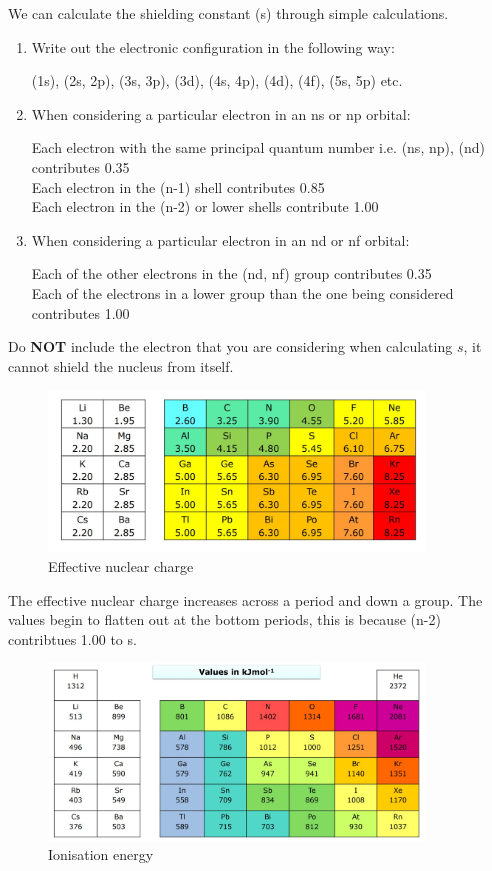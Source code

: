 \documentclass{article}
\newcommand{\NB}{{\large\lefthand}\quad}
\begin{document}
    We can calculate the shielding constant (s) through simple calculations. 
    \begin{enumerate}
        \item Write out the electronic configuration in the following way:
        
        (1s), (2s, 2p), (3s, 3p), (3d), (4s, 4p), (4d), (4f), (5s, 5p) etc.

        \item When considering a particular electron in an ns or np orbital:
        
        Each electron with the same principal quantum number i.e. (ns, np), (nd) contributes 0.35\\
        Each electron in the (n-1) shell contributes 0.85\\
        Each electron in the (n-2) or lower shells contribute 1.00 

        \item When considering a particular electron in an nd or nf orbital:
        
        Each of the other electrons in the (nd, nf) group contributes 0.35\\
        Each of the electrons in a lower group than the one being considered contributes 1.00\\
    \end{enumerate}
    \NB Do \textbf{NOT} include the electron that you are considering when calculating \(s\), it cannot shield the
    nucleus from itself.

    \begin{figure}[h]
        \centering
        \includegraphics[width=10cm]{eff.jpg}
        \caption{Effective nuclear charge}
    \end{figure}

    The effective nuclear charge increases across a period and down a group. The values begin to flatten out at
    the bottom periods, this is because (n-2) contribtues 1.00 to s. 
    \newpage
    \begin{figure}[h]
        \centering
        \includegraphics[width=10cm]{ionisation energy.jpg}
        \caption{Ionisation energy}
    \end{figure}
\end{document}
